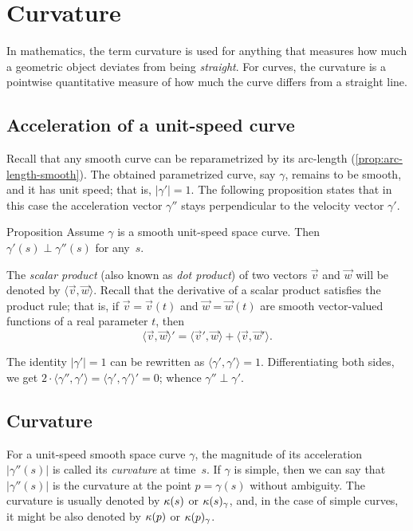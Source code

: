 \chapter{Curvature}
\label{chap:curve-curvature}

In mathematics, the term curvature is used for anything that measures how much a geometric object deviates from being \textit{straight}.
For curves, the curvature is a pointwise quantitative measure of how much the curve differs from a straight line.




\section{Acceleration of a unit-speed curve}

Recall that any smooth curve can be reparametrized by its arc-length (\ref{prop:arc-length-smooth}).
The obtained parametrized curve, say $\gamma$, remains to be smooth, and it has unit speed; 
that is, $|\gamma'|=1$.
The following proposition states that in this case
the acceleration vector $\gamma''$ stays perpendicular to the velocity vector $\gamma'$.

\begin{thm}{Proposition}\label{prop:a'-pertp-a''}
Assume $\gamma$ is a smooth unit-speed space curve.
Then $\gamma'(s)\perp \gamma''(s)$ for any~$s$.
\end{thm}

The \emph{scalar product} (also known as \textit{dot product}) of two vectors $\vec v$ and $\vec w$ will be denoted by $\langle \vec v,\vec w\rangle$.
Recall that the derivative of a scalar product satisfies the product rule;
that is, if $\vec v=\vec v(t)$ and $\vec w=\vec w(t)$ are smooth vector-valued functions of a real parameter $t$, then
\[\langle \vec v,\vec w\rangle'=\langle \vec v',\vec w\rangle+\langle \vec v,\vec w'\rangle.\]

The identity $|\gamma'|=1$ can be rewritten as $\langle\gamma',\gamma'\rangle=1$.
Differentiating both sides, we get
$2\cdot\langle\gamma'',\gamma'\rangle=\langle\gamma',\gamma'\rangle'=0$;
whence $\gamma''\perp\gamma'$.
\qeds

\section{Curvature}\label{sec:curvature}

For a unit-speed smooth space curve $\gamma$, the magnitude of its acceleration $|\gamma''(s)|$ is called its \emph{curvature} at  time~$s$.
If $\gamma$ is simple, then we can say that $|\gamma''(s)|$ is the curvature at the point $p=\gamma(s)$ without ambiguity.
The curvature is usually denoted by $\kappa(s)$ or $\kappa(s)_\gamma$, and, in the case of simple curves, it might be also denoted by $\kappa(p)$ or $\kappa(p)_\gamma$.

